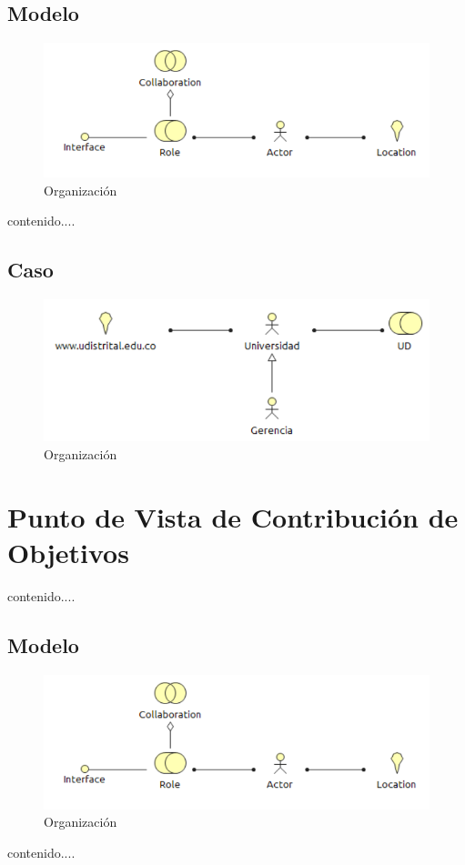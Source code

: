 \subsection{Modelo}
\begin{figure}[th!]
	\centering
	\includegraphics[width=0.8\linewidth]{arquitectura_diseno/imgs/M_Organizacion}
	\caption{Organización}
\end{figure}
\newpage
contenido....
\subsection{Caso}
\begin{figure}[th!]
	\centering
	\includegraphics[width=0.8\linewidth]{arquitectura_diseno/imgs/C_Organizacion}
	\caption{Organización}
\end{figure}
\newpage
\section{Punto de Vista de Contribución de Objetivos}
contenido....
\subsection{Modelo}
\begin{figure}[th!]
	\centering
	\includegraphics[width=0.8\linewidth]{arquitectura_diseno/imgs/M_Organizacion}
	\caption{Organización}
\end{figure}
\newpage
contenido....
